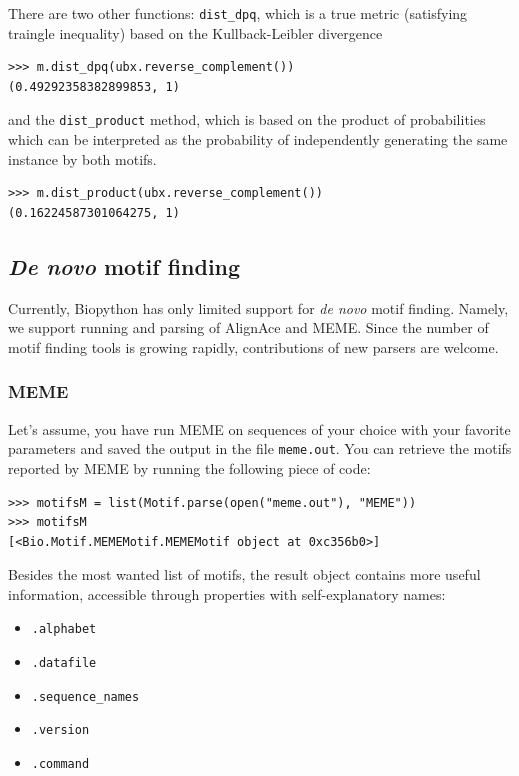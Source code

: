 \documentclass{report}
\begin{document}
There are two other functions: \verb|dist_dpq|, which is a true metric (satisfying traingle inequality) based on the Kullback-Leibler divergence 
\begin{verbatim}
>>> m.dist_dpq(ubx.reverse_complement())
(0.49292358382899853, 1)
\end{verbatim}

and the \verb|dist_product| method, which is based on the product of
probabilities which can be interpreted as the probability of
independently generating the same instance by both motifs.

\begin{verbatim}
>>> m.dist_product(ubx.reverse_complement())
(0.16224587301064275, 1)
\end{verbatim}

\subsection{\emph{De novo} motif finding}

Currently, Biopython has only limited support for \emph{de novo} motif
finding. Namely, we support running and parsing of AlignAce and
MEME. Since the number of motif finding tools is growing rapidly, 
contributions of new parsers are welcome. 

\subsubsection{MEME}

Let's assume, you have run MEME on sequences of your choice with your
favorite parameters and saved the output in the file
\verb|meme.out|. You can retrieve the motifs reported by MEME by
running the following piece of code:

\begin{verbatim}
>>> motifsM = list(Motif.parse(open("meme.out"), "MEME"))
>>> motifsM
[<Bio.Motif.MEMEMotif.MEMEMotif object at 0xc356b0>]
\end{verbatim}

Besides the most wanted list of motifs, the result object contains more useful information, accessible through properties with self-explanatory names:
\begin{itemize}
\item \verb|.alphabet|
\item \verb|.datafile|
\item \verb|.sequence_names|
\item \verb|.version|
\item \verb|.command|
\end{itemize}
\end{document}
